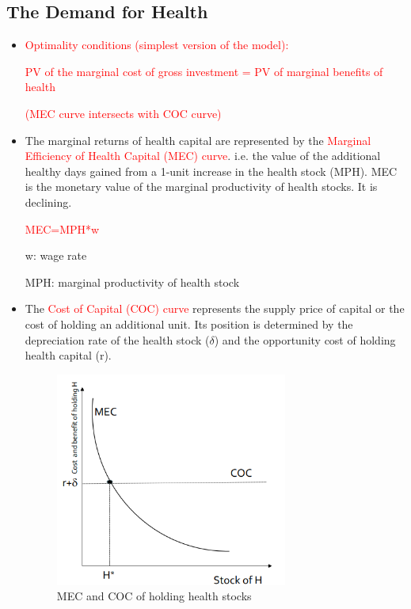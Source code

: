 \subsection{The Demand for Health}
\begin{itemize}
        \item \textcolor{red}{Optimality conditions (simplest version of the model):}

        \textcolor{red}{PV of the marginal cost of gross investment = PV of marginal benefits of health}
        
        \textcolor{red}{(MEC curve intersects with COC curve)}

        \item The marginal returns of health capital are represented by the \textcolor{red}{Marginal Efficiency of Health Capital (MEC) curve}. i.e. the value of the additional healthy days gained from a 1-unit increase in the health stock (MPH). MEC is the monetary value of the marginal productivity of health stocks. It is declining.
        
        \textcolor{red}{MEC=MPH*w}
       
        w: wage rate
        
        MPH: marginal productivity of health stock

        \item The \textcolor{red}{Cost of Capital (COC) curve} represents the supply price of capital or the cost of holding an additional unit. Its position is determined by the depreciation rate of the health stock ($\delta$) and the opportunity cost of holding health capital (r).

\begin{figure}[H]%
                \centering
                \includegraphics[width=3in]{images/ch3/25.png}
                \caption{MEC and COC of holding health stocks}
                \label{fig:label}
            \end{figure}
\end{itemize} 

